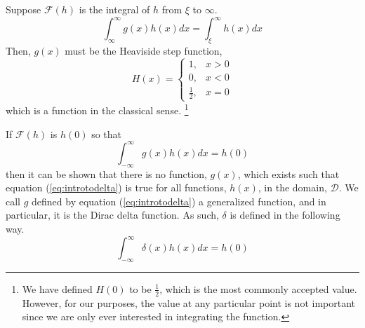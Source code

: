 \begin{example}
    Suppose \(\mathcal{F}(h)\) is the integral of \(h\) from \(\xi\) to \(\infty\).
    \begin{equation}
        \int_{\infty}^{\infty} g(x)h(x)dx = \int_{\xi}^{\infty} h(x) dx
    \end{equation}
    Then, \(g(x)\) must be the Heaviside step function,
    \begin{equation}
        H(x) = \begin{cases}
            1, & x>0\\
            0, & x<0\\
            \frac{1}{2}, & x=0
        \end{cases}
    \end{equation}
    which is a function in the classical sense. \footnote{We have defined \(H(0)\) to be \(\frac{1}{2}\), which is the most commonly accepted value. However, for our purposes, the value at any particular point is not important since we are only ever interested in integrating the function.}    
\end{example}

If \(\mathcal{F}(h)\) is \(h(0)\) so that
\begin{equation}\label{eq:introtodelta}
    \int_{-\infty}^{\infty}g(x)h(x) dx=h(0)
\end{equation}
then it can be shown that there is no function, \(g(x)\), which exists such that equation (\ref{eq:introtodelta}) is true for all functions, \(h(x)\), in the domain, \(\mathcal{D}\). We call \(g\) defined by equation (\ref{eq:introtodelta}) a generalized function, and in particular, it is the Dirac delta function. As such, \(\delta\) is defined in the following way.
\begin{equation}
    \int_{-\infty}^{\infty} \delta(x)h(x) dx = h(0)
\end{equation}

